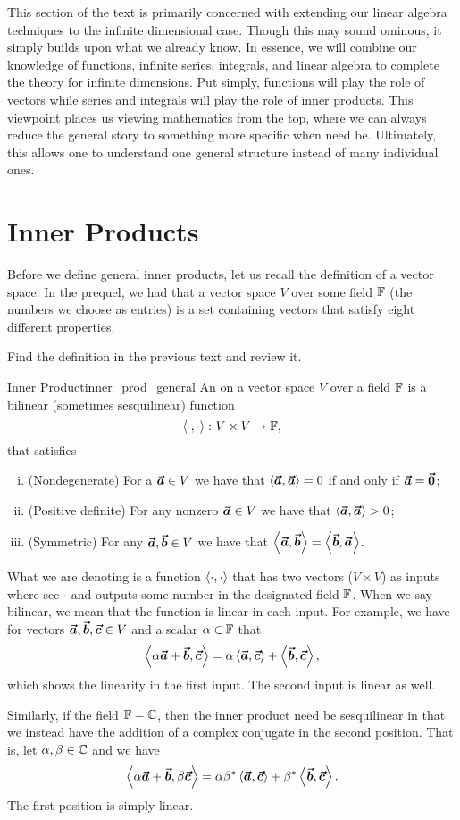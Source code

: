 This section of the text is primarily concerned with extending our linear algebra techniques to the infinite dimensional case.  Though this may sound ominous, it simply builds upon what we already know.  In essence, we will combine our knowledge of functions, infinite series, integrals, and linear algebra to complete the theory for infinite dimensions.  Put simply, functions will play the role of vectors while series and integrals will play the role of inner products.  This viewpoint places us viewing mathematics from the top, where we can always reduce the general story to something more specific when need be. Ultimately, this allows one to understand one general structure instead of many individual ones.

\section{Inner Products}

Before we define general inner products, let us recall the definition of a vector space.  In the prequel, we had that a vector space $V$ over some field $\mathbb{F}$ (the numbers we choose as entries) is a set containing vectors that satisfy eight different properties.

\begin{exercise}
	Find the definition in the previous text and review it.
\end{exercise}

\begin{df}{Inner Product}{inner_prod_general}
An  on a vector space $V$ over a field $\mathbb{F}$ is a bilinear (sometimes sesquilinear) function
\[
\left\langle \cdot, \cdot \right\rangle \colon V \times V \to \mathbb{F},
\]
that satisfies
\begin{enumerate}[i.]
	\item (Nondegenerate) For a $\boldsymbol{\vec{a}}\in V$ we have that $\left\langle \boldsymbol{\vec{a}}, \boldsymbol{\vec{a}} \right\rangle =0$ if and only if $\boldsymbol{\vec{a}}=\boldsymbol{\vec{0}}$;
	\item (Positive definite) For any nonzero $\boldsymbol{\vec{a}} \in V$ we have that $\left\langle \boldsymbol{\vec{a}}, \boldsymbol{\vec{a}} \right\rangle > 0$;
	\item (Symmetric) For any $\boldsymbol{\vec{a}},\boldsymbol{\vec{b}}\in V$ we have that $\left\langle \boldsymbol{\vec{a}}, \boldsymbol{\vec{b}} \right\rangle = \left\langle \boldsymbol{\vec{b}}, \boldsymbol{\vec{a}} \right\rangle$.
\end{enumerate}
What we are denoting is a function $\left\langle \cdot, \cdot \right\rangle$ that has two vectors ($V\times V$) as inputs where see $\cdot$ and outputs some number in the designated field $\mathbb{F}$. When we say bilinear, we mean that the function is linear in each input. For example, we have for vectors $\boldsymbol{\vec{a}},\boldsymbol{\vec{b}},\boldsymbol{\vec{c}}\in V$ and a scalar $\alpha \in \mathbb{F}$ that
\[
\left\langle \alpha\boldsymbol{\vec{a}} + \boldsymbol{\vec{b}}, \boldsymbol{\vec{c}} \right\rangle = \alpha \left\langle \boldsymbol{\vec{a}}, \boldsymbol{\vec{c}} \right\rangle + \left\langle \boldsymbol{\vec{b}}, \boldsymbol{\vec{c}} \right\rangle,
\]
which shows the linearity in the first input.  The second input is linear as well.

Similarly, if the field $\mathbb{F}=\mathbb{C}$, then the inner product need be sesquilinear in that we instead have the addition of a complex conjugate in the second position. That is, let $\alpha,\beta\in \mathbb{C}$ and we have
\[
\left\langle \alpha\boldsymbol{\vec{a}} + \boldsymbol{\vec{b}}, \beta\boldsymbol{\vec{c}} \right\rangle = \alpha \beta^*\left\langle \boldsymbol{\vec{a}}, \boldsymbol{\vec{c}} \right\rangle + \beta^*\left\langle \boldsymbol{\vec{b}}, \boldsymbol{\vec{c}} \right\rangle.
\]
The first position is simply linear.
\end{df}

